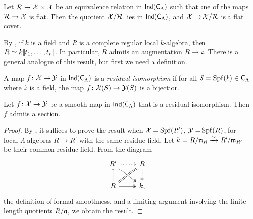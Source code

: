 \begin{theorem}\label{thm:quotients-ind}
Let $\mathcal{R}\to \mathcal{X}\times \mathcal{X}$ be an equivalence relation in 
$\operatorname{\mathsf{Ind}}(\mathsf{C}_\Lambda)$ such that one of the maps $\mathcal{R}\to \mathcal{X}$ is 
flat. Then the quotient $\mathcal{X}/\mathcal{R}$ lies in $\operatorname{\mathsf{Ind}}(\mathsf{C}_\Lambda)$, and 
$\mathcal{X}\to \mathcal{X}/\mathcal{R}$ is a flat cover. 
\end{theorem}

By \cite[29.7]{matsumura-1989}, if $k$ is a field and $R$ is a complete regular 
local $k$-algebra, then $R\simeq k\llbracket t_1,\dots,t_n \rrbracket$. In particular, $R$ 
admits an augmentation $R\to k$. There is a general analogue of 
this result, but first we need a definition. 

\begin{definition}
A map $f\colon \mathcal{X}\to \mathcal{Y}$ in $\operatorname{\mathsf{Ind}}(\mathsf{C}_\Lambda)$ is a 
\emph{residual isomorphism} if for all $S=\operatorname{Spf}(k)\in \mathsf{C}_\Lambda$ where 
$k$ is a field, the map $f\colon \mathcal{X}(S)\to \mathcal{Y}(S)$ is a bijection. 
\end{definition}

\begin{lemma}\label{thm:smooth-section}
Let $f\colon \mathcal{X}\to \mathcal{Y}$ be a smooth map in $\operatorname{\mathsf{Ind}}(\mathsf{C}_\Lambda)$ 
that is a residual isomorphism. Then $f$ admits a section. 
\end{lemma}
\begin{proof}
By \cite[VII\textsubscript{B} 0.1.1]{sga3-1}, it suffices to prove the result 
when $\mathcal{X}=\operatorname{Spf}(R')$, $\mathcal{Y}=\operatorname{Spf}(R)$, for local $\Lambda$-algebras $R\to R'$ 
with the same residue field. Let $k=R/\mathfrak{m}_R \xrightarrow\sim R'/\mathfrak{m}_{R'}$ be their common 
residue field. From the diagram 
\[
\begin{tikzcd}
	R' \ar[r, dotted] \ar[dr, two heads]
		& R \ar[d, two heads] \\
	R \ar[u] \ar[ur, equal] \ar[r, two heads]
		& k ,
\end{tikzcd}
\]
the definition of formal smoothness, and a limiting argument involving the 
finite length quotients $R/\mathfrak{a}$, we obtain the result. 
\end{proof}

